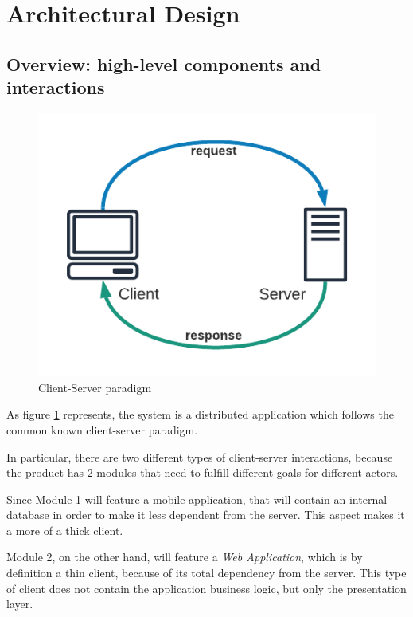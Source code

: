 \section{Architectural Design}
\subsection{Overview: high-level components and interactions}
\begin{figure}[H]
    \begin{center}
        \includegraphics[width=\textwidth/2]{img/Client-Server.png}
        \caption{Client-Server paradigm}\label{client_server_par}
    \end{center}
\end{figure}

As figure \ref{client_server_par} represents, the system is a distributed application which follows the common known client-server paradigm.

In particular, there are two different types of client-server interactions, because the product has 2 modules that need to fulfill different goals for different actors. 

Since Module 1 will feature a mobile application, that will contain an internal database in order to make it less dependent from the server. This aspect makes it a more of a thick client.

Module 2, on the other hand, will feature a \textit{Web Application}, which is by definition a thin client, because of its total dependency from the server.
This type of client does not contain the application business logic, but only the presentation layer.

